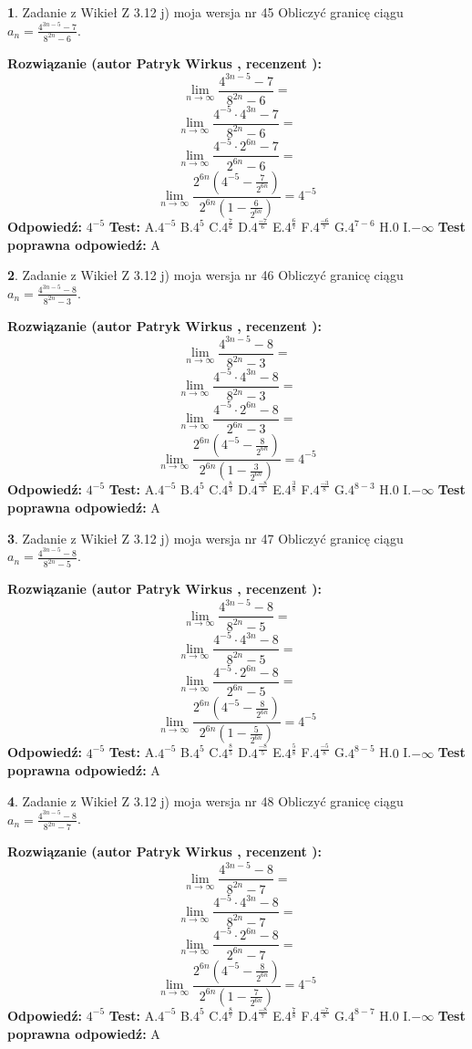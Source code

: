\documentclass[12pt, a4paper]{article}
\theoremstyle{definition} %
\newtheorem{zad}{}
\newcommand{\zadStart}[1]{\begin{zad}#1\newline}
\newcommand{\zadStop}{\end{zad}}
\newcommand{\rozwStart}[2]{\noindent \textbf{Rozwiązanie (autor #1 , recenzent #2): }\newline}
\newcommand{\rozwStop}{\newline}
\newcommand{\odpStart}{\noindent \textbf{Odpowiedź:}\newline}
\newcommand{\odpStop}{\newline}
\newcommand{\testStart}{\noindent \textbf{Test:}\newline}
\newcommand{\testStop}{\newline}
\newcommand{\kluczStart}{\noindent \textbf{Test poprawna odpowiedź:}\newline}
\newcommand{\kluczStop}{\newline}
\begin{document}
\zadStart{Zadanie z Wikieł Z 3.12 j) moja wersja nr 45}
Obliczyć granicę ciągu $a_{n}=\frac{4^{3n-5}-7}{8^{2n}-6}$.
\zadStop
\rozwStart{Patryk Wirkus}{}
$$\lim\limits_{n\to\infty}\frac{4^{3n-5}-7}{8^{2n}-6}=$$
$$\lim\limits_{n\to\infty}\frac{4^{-5} \cdot 4^{3n}-7}{8^{2n}-6}=$$
$$\lim\limits_{n\to\infty}\frac{4^{-5} \cdot 2^{6n}-7}{2^{6n}-6}=$$
$$\lim\limits_{n\to\infty}\frac{2^{6n}(4^{-5} - \frac{7}{2^{6n}})}{2^{6n}(1-\frac{6}{2^{6n}})}= 4^{-5}$$
\rozwStop
\odpStart
$4^{-5}$
\odpStop
\testStart
A.$4^{-5}$
B.$4^{5}$
C.$4^{\frac{7}{6}}$
D.$4^{\frac{-7}{6}}$
E.$4^{\frac{6}{7}}$
F.$4^{\frac{-6}{7}}$
G.$4^{7-6}$
H.$0$
I.$-\infty$
\testStop
\kluczStart
A
\kluczStop



\zadStart{Zadanie z Wikieł Z 3.12 j) moja wersja nr 46}
Obliczyć granicę ciągu $a_{n}=\frac{4^{3n-5}-8}{8^{2n}-3}$.
\zadStop
\rozwStart{Patryk Wirkus}{}
$$\lim\limits_{n\to\infty}\frac{4^{3n-5}-8}{8^{2n}-3}=$$
$$\lim\limits_{n\to\infty}\frac{4^{-5} \cdot 4^{3n}-8}{8^{2n}-3}=$$
$$\lim\limits_{n\to\infty}\frac{4^{-5} \cdot 2^{6n}-8}{2^{6n}-3}=$$
$$\lim\limits_{n\to\infty}\frac{2^{6n}(4^{-5} - \frac{8}{2^{6n}})}{2^{6n}(1-\frac{3}{2^{6n}})}= 4^{-5}$$
\rozwStop
\odpStart
$4^{-5}$
\odpStop
\testStart
A.$4^{-5}$
B.$4^{5}$
C.$4^{\frac{8}{3}}$
D.$4^{\frac{-8}{3}}$
E.$4^{\frac{3}{8}}$
F.$4^{\frac{-3}{8}}$
G.$4^{8-3}$
H.$0$
I.$-\infty$
\testStop
\kluczStart
A
\kluczStop



\zadStart{Zadanie z Wikieł Z 3.12 j) moja wersja nr 47}
Obliczyć granicę ciągu $a_{n}=\frac{4^{3n-5}-8}{8^{2n}-5}$.
\zadStop
\rozwStart{Patryk Wirkus}{}
$$\lim\limits_{n\to\infty}\frac{4^{3n-5}-8}{8^{2n}-5}=$$
$$\lim\limits_{n\to\infty}\frac{4^{-5} \cdot 4^{3n}-8}{8^{2n}-5}=$$
$$\lim\limits_{n\to\infty}\frac{4^{-5} \cdot 2^{6n}-8}{2^{6n}-5}=$$
$$\lim\limits_{n\to\infty}\frac{2^{6n}(4^{-5} - \frac{8}{2^{6n}})}{2^{6n}(1-\frac{5}{2^{6n}})}= 4^{-5}$$
\rozwStop
\odpStart
$4^{-5}$
\odpStop
\testStart
A.$4^{-5}$
B.$4^{5}$
C.$4^{\frac{8}{5}}$
D.$4^{\frac{-8}{5}}$
E.$4^{\frac{5}{8}}$
F.$4^{\frac{-5}{8}}$
G.$4^{8-5}$
H.$0$
I.$-\infty$
\testStop
\kluczStart
A
\kluczStop



\zadStart{Zadanie z Wikieł Z 3.12 j) moja wersja nr 48}
Obliczyć granicę ciągu $a_{n}=\frac{4^{3n-5}-8}{8^{2n}-7}$.
\zadStop
\rozwStart{Patryk Wirkus}{}
$$\lim\limits_{n\to\infty}\frac{4^{3n-5}-8}{8^{2n}-7}=$$
$$\lim\limits_{n\to\infty}\frac{4^{-5} \cdot 4^{3n}-8}{8^{2n}-7}=$$
$$\lim\limits_{n\to\infty}\frac{4^{-5} \cdot 2^{6n}-8}{2^{6n}-7}=$$
$$\lim\limits_{n\to\infty}\frac{2^{6n}(4^{-5} - \frac{8}{2^{6n}})}{2^{6n}(1-\frac{7}{2^{6n}})}= 4^{-5}$$
\rozwStop
\odpStart
$4^{-5}$
\odpStop
\testStart
A.$4^{-5}$
B.$4^{5}$
C.$4^{\frac{8}{7}}$
D.$4^{\frac{-8}{7}}$
E.$4^{\frac{7}{8}}$
F.$4^{\frac{-7}{8}}$
G.$4^{8-7}$
H.$0$
I.$-\infty$
\testStop
\kluczStart
A
\kluczStop
\end{document}
